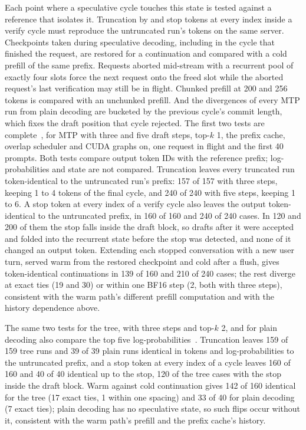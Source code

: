 Each point where a speculative cycle touches this state is tested against a reference that isolates it. Truncation by  and stop tokens at every index inside a verify cycle must reproduce the untruncated run's tokens on the same server. Checkpoints taken during speculative decoding, including in the cycle that finished the request, are restored for a continuation and compared with a cold prefill of the same prefix. Requests aborted mid-stream with a recurrent pool of exactly four slots force the next request onto the freed slot while the aborted request's last verification may still be in flight. Chunked prefill at 200 and 256 tokens is compared with an unchunked prefill. And the divergences of every MTP run from plain decoding are bucketed by the previous cycle's commit length, which fixes the draft position that cycle rejected. The first two tests are complete~, for MTP with three and five draft steps, top-$k$ 1, the prefix cache, overlap scheduler and CUDA graphs on, one request in flight and the first 40 prompts. Both tests compare output token IDs with the reference prefix; log-probabilities and state are not compared. Truncation leaves every truncated run token-identical to the untruncated run's prefix: 157 of 157 with three steps, keeping 1 to 4 tokens of the final cycle, and 240 of 240 with five steps, keeping 1 to 6. A stop token at every index of a verify cycle also leaves the output token-identical to the untruncated prefix, in 160 of 160 and 240 of 240 cases. In 120 and 200 of them the stop falls inside the draft block, so drafts after it were accepted and folded into the recurrent state before the stop was detected, and none of it changed an output token. Extending each stopped conversation with a new user turn, served warm from the restored checkpoint and cold after a flush, gives token-identical continuations in 139 of 160 and 210 of 240 cases; the rest diverge at exact ties (19 and 30) or within one BF16 step (2, both with three steps), consistent with the warm path's different prefill computation and with the history dependence above.

The same two tests for the tree, with three steps and top-$k$ 2, and for plain decoding also compare the top five log-probabilities~. Truncation leaves 159 of 159 tree runs and 39 of 39 plain runs identical in tokens and log-probabilities to the untruncated prefix, and a stop token at every index of a cycle leaves 160 of 160 and 40 of 40 identical up to the stop, 120 of the tree cases with the stop inside the draft block. Warm against cold continuation gives 142 of 160 identical for the tree (17 exact ties, 1 within one spacing) and 33 of 40 for plain decoding (7 exact ties); plain decoding has no speculative state, so such flips occur without it, consistent with the warm path's prefill and the prefix cache's history.

